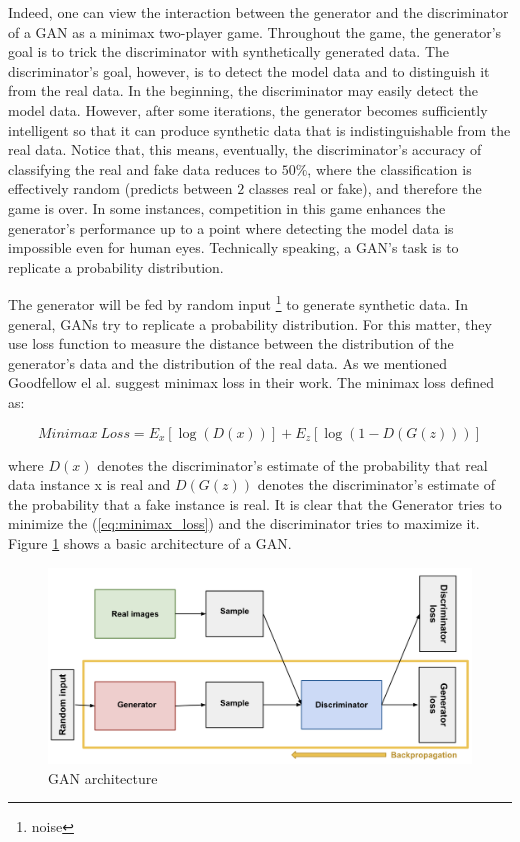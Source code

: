 Indeed, one can view the interaction between the generator and the discriminator of a GAN as a
minimax two-player game. Throughout the game, the generator's goal is to trick the discriminator
with synthetically generated data. The discriminator's goal, however, is to detect the model data
and to distinguish it from the real data. In the beginning, the discriminator may easily detect the
model data. However, after some iterations, the generator becomes sufficiently intelligent so that
it can produce synthetic data that is indistinguishable from the real data. Notice that, this means,
eventually, the discriminator's accuracy of classifying the real and fake data reduces to $50\%$,
where the classification is effectively random (predicts between $2$ classes
real or fake), and therefore the game is over. In some instances,
competition in this game enhances the generator's performance up to a point where detecting the
model data is impossible even for human eyes.
Technically speaking,  a GAN's task is to replicate a probability distribution.

The generator will be fed by random input \footnote{noise} to generate synthetic data. In general, GANs try to replicate a probability distribution. For this matter, they use loss function to measure the distance between the distribution of the generator's data and the distribution of the real data. As we mentioned Goodfellow el al. \cite{goodflew_bayesian_approach} suggest minimax loss in their work. The minimax loss defined as:

\begin{equation} \label{eq:minimax_loss}
  Minimax\ Loss = E_{x}[\log (D(x))]+E_{z}[\log (1-D(G(z)))]
\end{equation}


where $D(x)$  denotes the discriminator's estimate of the probability that real data instance x is
real and $D(G(z))$ denotes the discriminator's estimate of the probability that a fake instance is
real. It is clear that the Generator tries to minimize the (\ref{eq:minimax_loss}) and the
discriminator tries to maximize it. Figure \ref{fig:gan_architecture} shows a basic architecture of a
GAN.

\begin{figure}
  \centering
  \label{fig:gan_architecture}
  \includegraphics[width=1\textwidth]{fig/gan_architectur}
  \caption{GAN architecture
    \cite{google_bayesian_approach}}
\end{figure}

